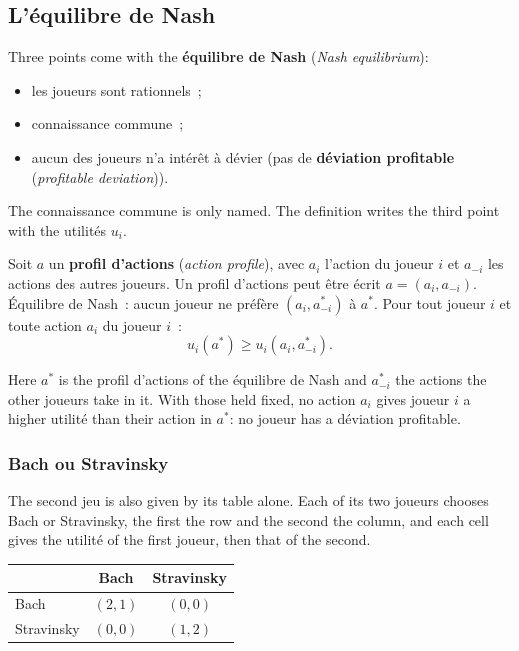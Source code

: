 \subsection{L'équilibre de Nash}

Three points come with the \textbf{équilibre de Nash} (\textit{Nash equilibrium}):
\begin{itemize}
  \item les joueurs sont rationnels~;
  \item connaissance commune~;
  \item aucun des joueurs n'a intérêt à dévier (pas de \textbf{déviation
    profitable} (\textit{profitable deviation})).
\end{itemize}
The connaissance commune is only named. The definition writes the third point with
the utilités $u_i$.

\begin{definition}
  Soit $a$ un \textbf{profil d'actions} (\textit{action profile}), avec $a_i$
  l'action du joueur $i$ et $a_{-i}$ les actions des autres joueurs. Un profil
  d'actions peut être écrit $a = (a_i, a_{-i})$.\\
  Équilibre de Nash~: aucun joueur ne préfère $(a_i, a^*_{-i})$ à $a^*$. Pour tout
  joueur $i$ et toute action $a_i$ du joueur $i$~:
  \[ u_i(a^*) \ge u_i(a_i, a^*_{-i}). \]
\end{definition}

Here $a^*$ is the profil d'actions of the équilibre de Nash and $a^*_{-i}$ the actions the other
joueurs take in it. With those held fixed, no action $a_i$ gives joueur $i$ a higher
utilité than their action in $a^*$: no joueur has a déviation profitable.

\subsubsection{Bach ou Stravinsky}

The second jeu is also given by its table alone. Each of its two joueurs chooses
Bach or Stravinsky, the first the row and the second the column, and each cell
gives the utilité of the first joueur, then that of the second.

\begin{center}
  \small
  \begin{tabular}{@{}lcc@{}}
    \toprule
    & Bach & Stravinsky \\
    \midrule
    Bach       & $(2, 1)$ & $(0, 0)$ \\
    Stravinsky & $(0, 0)$ & $(1, 2)$ \\
    \bottomrule
  \end{tabular}
\end{center}


